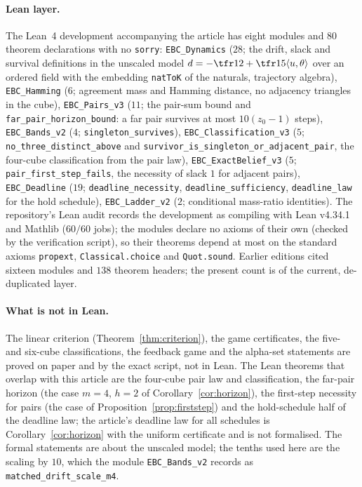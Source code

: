 \paragraph{Lean layer.}
The Lean~4 \cite{MouraUllrich2021} development accompanying the article has eight modules and $80$ theorem declarations with no \texttt{sorry}: \texttt{EBC\_Dynamics} ($28$; the drift, slack and survival definitions in the unscaled model $d=-\tfr12+\tfr15\langle u,\theta\rangle$ over an ordered field with the embedding \texttt{natToK} of the naturals, trajectory algebra), \texttt{EBC\_Hamming} ($6$; agreement mass and Hamming distance, no adjacency triangles in the cube), \texttt{EBC\_Pairs\_v3} ($11$; the pair-sum bound and \texttt{far\_pair\_horizon\_bound}: a far pair survives at most $10(z_0-1)$ steps), \texttt{EBC\_Bands\_v2} ($4$; \texttt{singleton\_survives}), \texttt{EBC\_Classification\_v3} ($5$; \texttt{no\_three\_distinct\_above} and \texttt{survivor\_is\_singleton\_or\_adjacent\_pair}, the four-cube classification from the pair law), \texttt{EBC\_ExactBelief\_v3} ($5$; \texttt{pair\_first\_step\_fails}, the necessity of slack $1$ for adjacent pairs), \texttt{EBC\_Deadline} ($19$; \texttt{deadline\_necessity}, \texttt{deadline\_sufficiency}, \texttt{deadline\_law} for the hold schedule), \texttt{EBC\_Ladder\_v2} ($2$; conditional mass-ratio identities). The repository's Lean audit records the development as compiling with Lean v4.34.1 and Mathlib ($60/60$ jobs); the modules declare no axioms of their own (checked by the verification script), so their theorems depend at most on the standard axioms \texttt{propext}, \texttt{Classical.choice} and \texttt{Quot.sound}. Earlier editions cited sixteen modules and $138$ theorem headers; the present count is of the current, de-duplicated layer.

\paragraph{What is not in Lean.}
The linear criterion (Theorem~\ref{thm:criterion}), the game certificates, the five- and six-cube classifications, the feedback game and the alpha-set statements are proved on paper and by the exact script, not in Lean. The Lean theorems that overlap with this article are the four-cube pair law and classification, the far-pair horizon (the case $m=4$, $h=2$ of Corollary~\ref{cor:horizon}), the first-step necessity for pairs (the case of Proposition~\ref{prop:firststep}) and the hold-schedule half of the deadline law; the article's deadline law for all schedules is Corollary~\ref{cor:horizon} with the uniform certificate and is not formalised. The formal statements are about the unscaled model; the tenths used here are the scaling by $10$, which the module \texttt{EBC\_Bands\_v2} records as \texttt{matched\_drift\_scale\_m4}.
